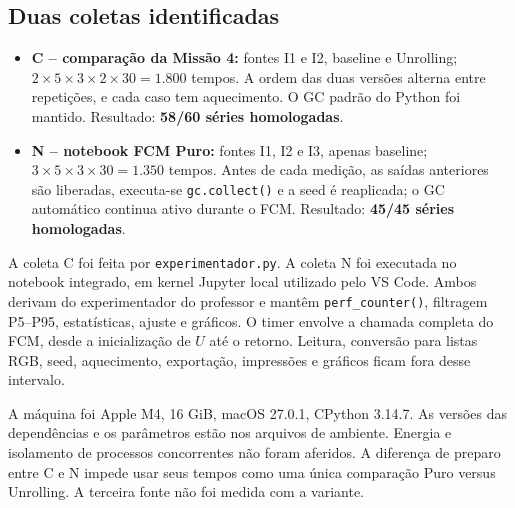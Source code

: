\documentclass[11pt,a4paper]{article}
\begin{document}
\subsection{Duas coletas identificadas}
\begin{itemize}
\item \textbf{C -- comparação da Missão 4:} fontes I1 e I2, baseline e
Unrolling; $2\times5\times3\times2\times30=1.800$ tempos.
A ordem das duas versões alterna entre repetições, e cada caso tem aquecimento.
O GC padrão do Python foi mantido. Resultado: \textbf{58/60 séries homologadas}.
\item \textbf{N -- notebook FCM Puro:} fontes I1, I2 e I3, apenas baseline;
$3\times5\times3\times30=1.350$ tempos.
Antes de cada medição, as saídas anteriores são liberadas, executa-se
\texttt{gc.collect()} e a seed é reaplicada; o GC automático continua ativo
durante o FCM. Resultado: \textbf{45/45 séries homologadas}.
\end{itemize}

A coleta C foi feita por \texttt{experimentador.py}. A coleta N foi executada
no notebook integrado, em kernel Jupyter local utilizado pelo VS Code.
Ambos derivam do experimentador do professor e mantêm
\texttt{perf\_counter()}, filtragem P5--P95, estatísticas, ajuste e gráficos.
O timer envolve a chamada completa do FCM, desde a inicialização de $U$
até o retorno. Leitura, conversão para listas RGB, seed, aquecimento,
exportação, impressões e gráficos ficam fora desse intervalo.

A máquina foi Apple M4, 16 GiB, macOS 27.0.1, CPython 3.14.7.
As versões das dependências e os parâmetros estão nos arquivos de ambiente.
Energia e isolamento de processos concorrentes não foram aferidos.
A diferença de preparo entre C e N impede usar seus tempos como uma única
comparação Puro versus Unrolling. A terceira fonte não foi medida com a variante.
\end{document}
